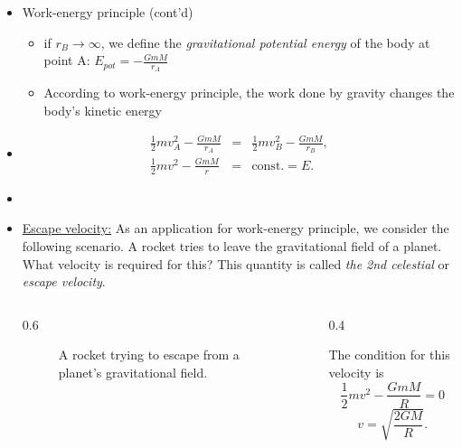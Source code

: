 \documentclass[t,aspectratio=169]{beamer}
\begin{document}
\begin{frame}
\begin{itemize}
\pagebreak
\item Work-energy principle (cont'd)
\begin{itemize}
\item if $r_{B}\rightarrow\infty$, we define the \emph{gravitational potential energy} of the body at point A: $E_{pot}=-\frac{GmM}{r_{A}}$ 
\item According to work-energy principle, the work done by gravity changes the body's kinetic energy
\end{itemize}
\item {\color{red}{Work-energy principle in presence of gravity}}
\begin{eqnarray*}
\frac{1}{2}mv_{A}^{2}-\frac{GmM}{r_{A}}&=&\frac{1}{2}mv_{B}^{2}-\frac{GmM}{r_{B}}, \\
\frac{1}{2}mv^{2}-\frac{GmM}{r}&=&\text{const.}=E.
\end{eqnarray*}
\item {\color{blue}{Mechanical energy is conserved in gravitational interaction. Gravity is a conservative force.}}

\pagebreak
\item \underline{Escape velocity:} As an application for work-energy principle, we consider the following scenario. A rocket tries to leave the gravitational field of a planet. What velocity is required for this? This quantity is called \emph{the 2nd celestial} or \emph{escape velocity}.
\begin{columns}
\begin{column}{0.6\textwidth}
\begin{center}
\begin{figure}
\caption{A rocket trying to escape from a planet's gravitational field.}
\end{figure}
\end{center}
\end{column}
\begin{column}{0.4\textwidth}
\begin{center}
The condition for this velocity is 
$$\frac{1}{2}mv^{2}-\frac{GmM}{R}=0$$
$$v=\sqrt{\frac{2GM}{R}}.$$
\end{center}
\end{column}
\end{columns}


\end{itemize}
\end{frame}
\end{document}

